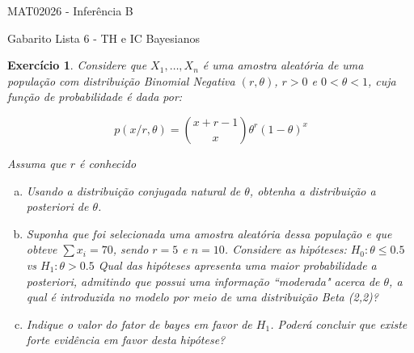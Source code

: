 \documentclass[letter,11pt]{article}
\newtheorem{exer}{Exercício}
\begin{document}
\begin{center}{ \Large MAT02026 - Inferência B }\end{center}

\begin{center}
{\large  \sc Gabarito Lista 6 - TH e IC Bayesianos}
\end{center}
\vspace{5mm}

\begin{exer} \rm
Considere que $X_1, \ldots, X_n$ é uma amostra aleatória de uma população com distribuição Binomial Negativa $(r, \theta)$, $r>0$ e $0<\theta<1$, cuja função de probabilidade é dada por:

$$
p(x/ r, \theta) = {x+r-1 \choose x}\theta^r(1-\theta)^x
$$

Assuma que $r$ é conhecido

\begin{enumerate}[a)]
  \item Usando a distribuição conjugada natural de $\theta$, obtenha a distribuição a \textit{posteriori} de $\theta$.
  \item Suponha que foi selecionada uma amostra aleatória dessa população e que obteve $\sum x_i=70$, sendo $r=5$ e $n=10$. Considere as hipóteses:
$H_0: \theta \leq 0.5$ vs $H_1: \theta > 0.5$
Qual das hipóteses apresenta uma maior probabilidade a \textit{posteriori}, admitindo que possui uma informação ``moderada" acerca de $\theta$, a qual é introduzida no modelo por meio de uma distribuição Beta (2,2)?
  \item Indique o valor do fator de bayes em favor de $H_1$. Poderá concluir que existe forte evidência em favor desta hipótese?
\end{enumerate}
\end{exer}
\end{document}
